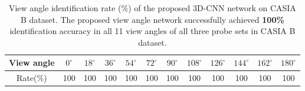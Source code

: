 \begin{table}[t]
	\centering
	\caption[View angle identification rate (\%) of the proposed 3D-CNN network on CASIA B dataset]
	{View angle identification rate (\%) of the proposed 3D-CNN network on CASIA B dataset. The proposed view angle network successfully achieved \textbf{100\%} identification accuracy in all 11 view angles of all three probe sets in CASIA B dataset. \label{table:result_wd_identification}}
	
	{\begin{tabular*}{35pc}{cccc cccc cccc}\hline \noalign{\smallskip}
			View angle &${0^{\circ}}$	&${18^{\circ}}$  &${36^{\circ}}$ &${54^{\circ}}$	&${72^{\circ}}$	&${90^{\circ}}$	&${108^{\circ}}$ &${126^{\circ}}$ &${144^{\circ}}$ &${162^{\circ}}$  &${180^{\circ}}$ \\\hline \noalign{\smallskip}
			
			Rate(\%) &100 &100 &100 &100 &100 &100 &100 &100 &100 &100 &100 \\ \hline
	\end{tabular*}}{}
\end{table}


